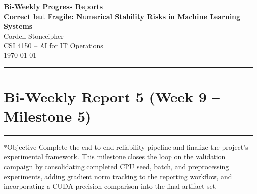 \documentclass[11pt]{article}
\newcommand{\reportblock}[2]{%
  \section*{#1}%
  \vspace{2pt}\hrule\vspace{6pt}
}
\begin{document}
\begin{center}
  {\LARGE \textbf{Bi-Weekly Progress Reports}}\\[4pt]
  {\large \textbf{Correct but Fragile: Numerical Stability Risks in Machine Learning Systems}}\\[6pt]
  {\large Cordell Stonecipher}\\
  {\large CSI 4150 -- AI for IT Operations}\\
  {\large \today}
\end{center}


\vspace{6pt}
\hrule
\vspace{10pt}

\reportblock{Bi-Weekly Report 5 (Week 9 -- Milestone 5)}

\subsection*{Objective}
Complete the end-to-end reliability pipeline and finalize the project’s experimental framework. This milestone closes the loop on the validation campaign by consolidating completed CPU seed, batch, and preprocessing experiments, adding gradient norm tracking to the reporting workflow, and incorporating a CUDA precision comparison into the final artifact set.
\end{document}

